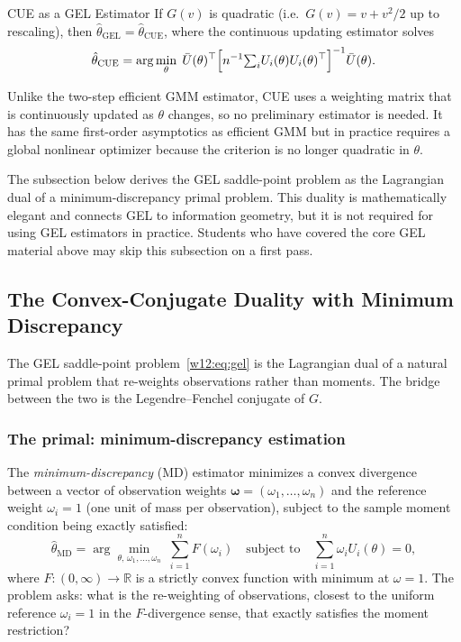 \documentclass[master.tex]{subfiles}
\begin{document}
\begin{thm}{CUE as a GEL Estimator \citep{neweysmith2004}}
\label{w12:thm:cue-gel}
If $G(v)$ is quadratic (i.e.\ $G(v) = v + v^2/2$ up to rescaling), then $\hat\theta_{\mathrm{GEL}} =
\hat\theta_{\mathrm{CUE}}$, where the continuous updating estimator
solves
\[
  \hat\theta_{\mathrm{CUE}}
  = \arg\min_\theta\;
    \bar{U}(\theta)^\top
    \Bigl[n^{-1}{\textstyle\sum_i} U_i(\theta)U_i(\theta)^\top\Bigr]^{-1}
    \bar{U}(\theta).
\]
\end{thm}

Unlike the two-step efficient GMM estimator, CUE uses a weighting
matrix that is continuously updated as $\theta$ changes, so no
preliminary estimator is needed.  It has the same first-order
asymptotics as efficient GMM but in practice requires a global
nonlinear optimizer because the criterion is no longer quadratic in
$\theta$.

\begin{tcolorbox}[remarkstyle, title={Optional Enrichment:
  Convex-Conjugate Duality (\S\ref{w12:sec:gel:dual})}]
The subsection below derives the GEL saddle-point problem as the
Lagrangian dual of a minimum-discrepancy primal problem.  This
duality is mathematically elegant and connects GEL to information
geometry, but it is not required for using GEL estimators in
practice.  Students who have covered the core GEL material above
may skip this subsection on a first pass.
\end{tcolorbox}

\subsection{The Convex-Conjugate Duality with Minimum Discrepancy}
\label{w12:sec:gel:dual}

The GEL saddle-point problem~\eqref{w12:eq:gel} is the Lagrangian
dual of a natural primal problem that re-weights observations rather
than moments.  The bridge between the two is the
Legendre--Fenchel conjugate of $G$.

\subsubsection*{The primal: minimum-discrepancy estimation}

The \emph{minimum-discrepancy} (MD) estimator minimizes a convex
divergence between a vector of observation weights
$\boldsymbol\omega = (\omega_1, \ldots, \omega_n)$ and the
reference weight $\omega_i = 1$ (one unit of mass per observation),
subject to the sample moment condition being exactly satisfied:
\begin{equation}
  \hat\theta_{\mathrm{MD}}
  = \arg\min_{\theta,\,\omega_1,\ldots,\omega_n}\;
    \sum_{i=1}^n F(\omega_i)
  \quad
  \text{subject to}
  \quad
  \sum_{i=1}^n \omega_i U_i(\theta) = 0,
  \label{w12:eq:md}
\end{equation}
where $F\colon(0,\infty)\to\mathbb{R}$ is a strictly convex function
with minimum at $\omega = 1$.  The problem asks: what is the
re-weighting of observations, closest to the uniform reference
$\omega_i = 1$ in the $F$-divergence sense, that exactly satisfies
the moment restriction?
\end{document}
